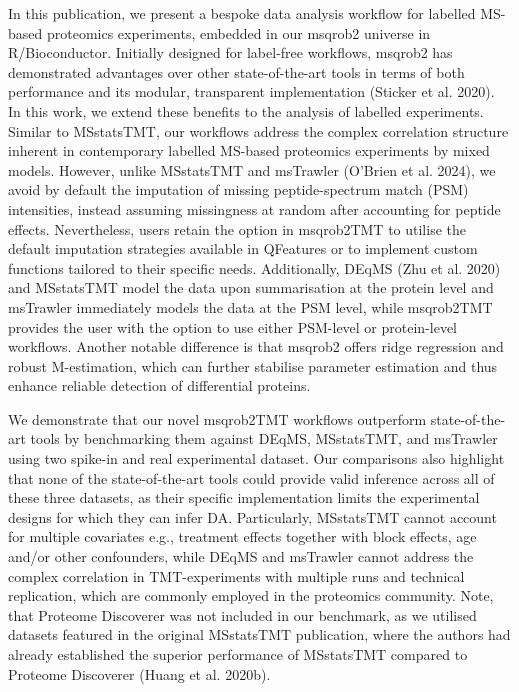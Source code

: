 \documentclass[
  letterpaper,
  DIV=11,
  numbers=noendperiod]{scrartcl}
\begin{document}
In this publication, we present a bespoke data analysis workflow for
labelled MS-based proteomics experiments, embedded in our msqrob2
universe in R/Bioconductor. Initially designed for label-free workflows,
msqrob2 has demonstrated advantages over other state-of-the-art tools in
terms of both performance and its modular, transparent implementation
(Sticker et al. 2020). In this work, we extend these benefits to the
analysis of labelled experiments. Similar to MSstatsTMT, our workflows
address the complex correlation structure inherent in contemporary
labelled MS-based proteomics experiments by mixed models. However,
unlike MSstatsTMT and msTrawler (O'Brien et al. 2024), we avoid by
default the imputation of missing peptide-spectrum match (PSM)
intensities, instead assuming missingness at random after accounting for
peptide effects. Nevertheless, users retain the option in msqrob2TMT to
utilise the default imputation strategies available in QFeatures or to
implement custom functions tailored to their specific needs.
Additionally, DEqMS (Zhu et al. 2020) and MSstatsTMT model the data upon
summarisation at the protein level and msTrawler immediately models the
data at the PSM level, while msqrob2TMT provides the user with the
option to use either PSM-level or protein-level workflows. Another
notable difference is that msqrob2 offers ridge regression and robust
M-estimation, which can further stabilise parameter estimation and thus
enhance reliable detection of differential proteins.

We demonstrate that our novel msqrob2TMT workflows outperform
state-of-the-art tools by benchmarking them against DEqMS, MSstatsTMT,
and msTrawler using two spike-in and real experimental dataset. Our
comparisons also highlight that none of the state-of-the-art tools could
provide valid inference across all of these three datasets, as their
specific implementation limits the experimental designs for which they
can infer DA. Particularly, MSstatsTMT cannot account for multiple
covariates e.g., treatment effects together with block effects, age
and/or other confounders, while DEqMS and msTrawler cannot address the
complex correlation in TMT-experiments with multiple runs and technical
replication, which are commonly employed in the proteomics community.
Note, that Proteome Discoverer was not included in our benchmark, as we
utilised datasets featured in the original MSstatsTMT publication, where
the authors had already established the superior performance of
MSstatsTMT compared to Proteome Discoverer (Huang et al. 2020b).
\end{document}
